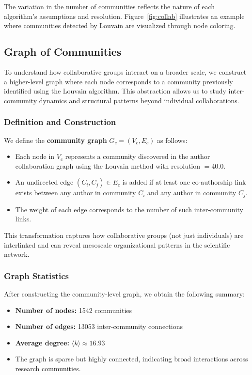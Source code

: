 \documentclass[12pt]{article}
\begin{document}
The variation in the number of communities reflects the nature of each algorithm’s assumptions and resolution. Figure~\ref{fig:collab} illustrates an example where communities detected by Louvain are visualized through node coloring.

\subsection{Graph of Communities}

To understand how collaborative groups interact on a broader scale, we construct a higher-level graph where each node corresponds to a community previously identified using the Louvain algorithm. This abstraction allows us to study inter-community dynamics and structural patterns beyond individual collaborations.

\subsubsection*{Definition and Construction}

We define the \textbf{community graph} $G_c = (V_c, E_c)$ as follows:
\begin{itemize}
    \item Each node in $V_c$ represents a community discovered in the author collaboration graph using the Louvain method with resolution $= 40.0$.
    \item An undirected edge $(C_i, C_j) \in E_c$ is added if at least one co-authorship link exists between any author in community $C_i$ and any author in community $C_j$.
    \item The weight of each edge corresponds to the number of such inter-community links.
\end{itemize}

This transformation captures how collaborative groups (not just individuals) are interlinked and can reveal mesoscale organizational patterns in the scientific network.

\subsubsection*{Graph Statistics}

After constructing the community-level graph, we obtain the following summary:

\begin{itemize}
    \item \textbf{Number of nodes:} 1542 communities
    \item \textbf{Number of edges:} 13053 inter-community connections
    \item \textbf{Average degree:} $\langle k \rangle \approx 16.93$
    \item The graph is sparse but highly connected, indicating broad interactions across research communities.
\end{itemize}
\end{document}
